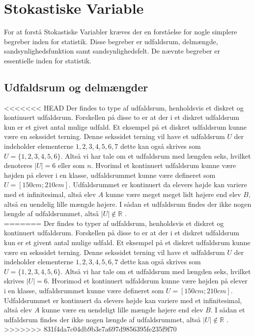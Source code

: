 \documentclass[../../SRP.tex]{subfiles}
\begin{document}
\chapter{Stokastiske Variable}

For at forstå Stokastiske Variabler kræves der en forståelse for nogle simplere begreber inden for statistik. Disse begreber er udfaldsrum, delmængde, sandsynlighedsfunktion samt sandsynlighedsfelt. De nævnte begreber er essentielle inden for statistik.

\section{Udfaldsrum og delmængder}

<<<<<<< HEAD
Der findes to type af udfaldsrum, henholdsvis et diskret og kontinuert udfaldsrum. Forskellen på disse to er at der i et diskret udfaldsrum kun er et givet antal mulige udfald. Et eksempel på et diskret udfaldsrum kunne være en sekssidet terning. Denne sekssidet terning vil have et udfaldsrum $U$ der indeholder elementerne $1,2,3,4,5,6,7$ dette kan også skrives som $U = \{1,2,3,4,5,6\}$. Altså vi har tale om et udfaldsrum med længden seks, hvilket denoteres $|U| = 6$ eller som $n$. Hvorimd et kontinuert udfaldsrum kunne være højden på elever i en klasse, udfaldsrummet kunne være defineret som $U = [150cm;210cm]$. Udfaldsrummet er kontinuert da elevers højde kan variere med et infinitesimal, altså elev $A$ kunne være meget meget lidt højere end elev $B$, altså en uendelig lille mængde højere. I sådan et udfaldsrum findes der ikke nogen længde af udfaldsrummet, altså $|U| \notin \mathbb{R}$ \cite{SC}. \\
=======
Der findes to typer af udfaldsrum, henholdsvis et diskret og kontinuert udfaldsrum. Forskellen på disse to er at der i et diskret udfaldsrum kun er et givent antal mulige udfald. Et eksempel på et diskret udfaldsrum kunne være en sekssidet terning. Denne sekssidet terning vil have et udfaldsrum $U$ der indeholder elementerne $1,2,3,4,5,6,7$ dette kan også skrives som $U = \{1,2,3,4,5,6\}$. Altså vi har tale om et udfaldsrum med længden seks, hvilket skrives $|U| = 6$. Hvorimod et kontinuert udfaldsrum kunne være højden på elever i en klasse, udfaldsrummet kunne være defineret som $U = [150cm;210cm]$. Udfaldsrummet er kontinuert da elevers højde kan variere med et infinitesimal, altså elev $A$ kunne være en uendeligt lille mængde højere end elev $B$. I sådan et udfaldsrum findes der ikke nogen længde af udfaldsrummet, altså $|U| \notin \mathbb{R}$ \cite{SC}. \\
>>>>>>> 831f4da7c04db9b3e7a697d9856395fe235f9f70
\end{document}
